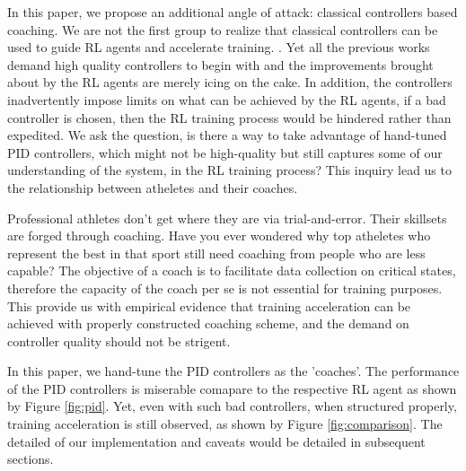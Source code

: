 \documentclass[journal]{IEEEtran}
\begin{document}
In this paper, we propose an additional angle of attack: classical controllers based coaching. We are not the first group to realize that classical controllers can be used to guide RL agents and accelerate training. \cite{Xie2018LearningWT}\cite{Carlucho2017IncrementalQS}\cite{Pavse2020RIDMRI}. Yet all the previous works demand high quality controllers to begin with and the improvements brought about by the RL agents are merely icing on the cake. In addition, the controllers inadvertently impose limits on what can be achieved by the RL agents, if a bad controller is chosen, then the RL training process would be hindered rather than expedited. We ask the question, is there a way to take advantage of hand-tuned PID controllers, which might not be high-quality but still captures some of our understanding of the system, in the RL training process? This inquiry lead us to the relationship between atheletes and their coaches.

Professional athletes don't get where they are via trial-and-error. Their skillsets are forged through coaching. Have you ever wondered why top atheletes who represent the best in that sport still need coaching from people who are less capable? The objective of a coach is to facilitate data collection on critical states, therefore the capacity of the coach per se is not essential for training purposes. This provide us with empirical evidence that training acceleration can be achieved with properly constructed coaching scheme, and the demand on controller quality should not be strigent. 

In this paper, we hand-tune the PID controllers as the 'coaches'. The performance of the PID controllers is miserable comapare to the respective RL agent as shown by Figure \ref{fig:pid}. Yet, even with such bad controllers, when structured properly, training acceleration is still observed, as shown by Figure \ref{fig:comparison}. The detailed of our implementation and caveats would be detailed in subsequent sections.
\end{document}
